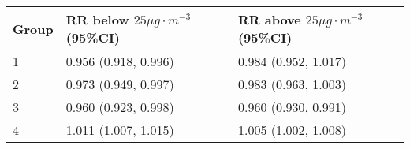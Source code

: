 \begin{tabular}{lll}
  \hline
Group & RR below $25 \mu g \cdot m^{-3}$ (95\%CI) & RR above $25 \mu g \cdot m^{-3}$ (95\%CI) \\ 
  \hline
   1 & 0.956 (0.918, 0.996) & 0.984 (0.952, 1.017) \\ 
     2 & 0.973 (0.949, 0.997) & 0.983 (0.963, 1.003) \\ 
     3 & 0.960 (0.923, 0.998) & 0.960 (0.930, 0.991) \\ 
     4 & 1.011 (1.007, 1.015) & 1.005 (1.002, 1.008) \\ 
   \hline
\end{tabular}


